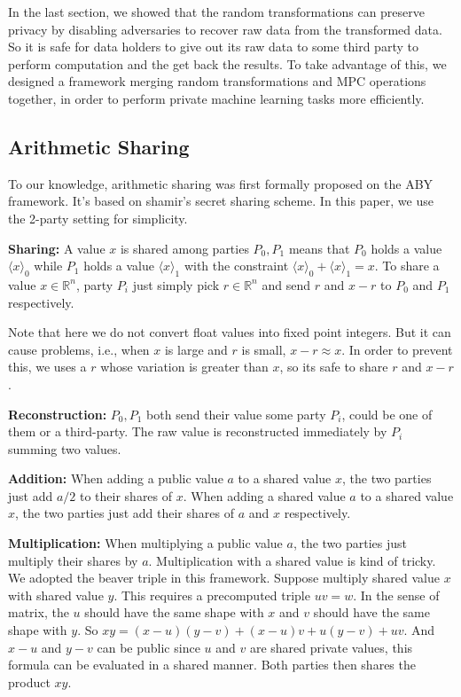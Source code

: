 In the last section, we showed that the random transformations can preserve privacy by disabling adversaries to recover raw data from the transformed data. So it is safe for data holders to give out its raw data to some third party to perform computation and the get back the results. To take advantage of this, we designed a framework merging random transformations and MPC operations together, in order to perform private machine learning tasks more efficiently.
\subsection{Arithmetic Sharing}
To our knowledge, arithmetic sharing was first formally proposed on the ABY\cite{demmler2015aby} framework. It's based on shamir's secret sharing scheme\cite{shamir1979share}. In this paper, we use the 2-party setting for simplicity.

\textbf{Sharing: }
A value $x$ is shared among parties $P_0, P_1$ means that $P_0$ holds a value $\langle x\rangle_0$ while $P_1$ holds a value $\langle x\rangle_1$ with the constraint $\langle x\rangle_0 +\langle x\rangle_1 = x$. To share a value $x\in \mathbb R^n$, party $P_i$ just simply pick $r \in \mathbb R^n$ and send $r$ and $x - r$ to $P_0$ and $P_1$ respectively.

Note that here we do not convert float values into fixed point integers. But it can cause problems, i.e., when $x$ is large and $r$ is small, $x - r \approx x$. In order to prevent this, we uses a $r$ whose variation is greater than $x$, so its safe to share $r$ and $x - r$. 

\textbf{Reconstruction: }
$P_0, P_1$ both send their value some party $P_i$, could be one of them or a third-party. The raw value is reconstructed immediately by $P_i$ summing two values.

\textbf{Addition: }
When adding a public value $a$ to a shared value $x$, the two parties just add $a/2$ to their shares of $x$.
When adding a shared value $a$ to a shared value $x$, the two parties just add their shares of $a$ and $x$ respectively.

\textbf{Multiplication: }
When multiplying a public value $a$, the two parties just multiply their shares by $a$.
Multiplication with a shared value is kind of tricky. We adopted the beaver triple in this framework. Suppose multiply shared value $x$ with shared value $y$. This requires a precomputed triple $uv = w$. In the sense of matrix, the $u$ should have the same shape with $x$ and $v$ should have the same shape with $y$. So $xy = (x - u)(y - v) + (x -u)v + u(y - v) + uv$. And $x - u$ and $y - v$ can be public since $u$ and $v$ are shared private values, this formula can be evaluated in a shared manner. Both parties then shares the product $xy$.


